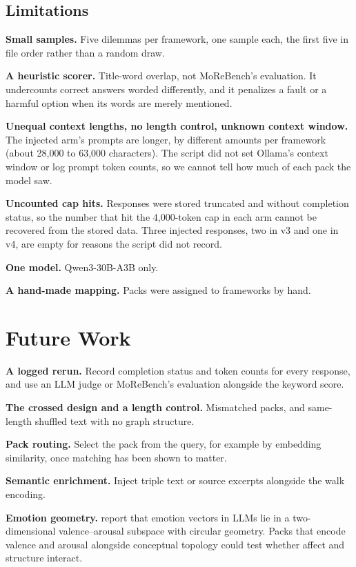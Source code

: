 \documentclass[11pt,a4paper]{article}
\begin{document}
\subsection{Limitations}
\label{sec:limits}

\textbf{Small samples.} Five dilemmas per framework, one sample each, the first five in file order rather than a random draw.

\textbf{A heuristic scorer.} Title-word overlap, not MoReBench's evaluation. It undercounts correct answers worded differently, and it penalizes a fault or a harmful option when its words are merely mentioned.

\textbf{Unequal context lengths, no length control, unknown context window.} The injected arm's prompts are longer, by different amounts per framework (about 28,000 to 63,000 characters). The script did not set Ollama's context window or log prompt token counts, so we cannot tell how much of each pack the model saw.

\textbf{Uncounted cap hits.} Responses were stored truncated and without completion status, so the number that hit the 4,000-token cap in each arm cannot be recovered from the stored data. Three injected responses, two in v3 and one in v4, are empty for reasons the script did not record.

\textbf{One model.} Qwen3-30B-A3B only.

\textbf{A hand-made mapping.} Packs were assigned to frameworks by hand.

\section{Future Work}

\textbf{A logged rerun.} Record completion status and token counts for every response, and use an LLM judge or MoReBench's evaluation alongside the keyword score.

\textbf{The crossed design and a length control.} Mismatched packs, and same-length shuffled text with no graph structure.

\textbf{Pack routing.} Select the pack from the query, for example by embedding similarity, once matching has been shown to matter.

\textbf{Semantic enrichment.} Inject triple text or source excerpts alongside the walk encoding.

\textbf{Emotion geometry.} \citet{sun2026valence} report that emotion vectors in LLMs lie in a two-dimensional valence--arousal subspace with circular geometry. Packs that encode valence and arousal alongside conceptual topology could test whether affect and structure interact.
\end{document}
